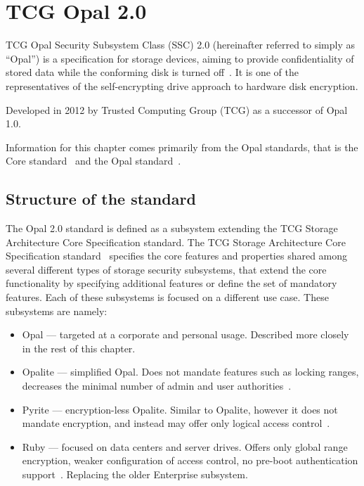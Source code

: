 \chapter{TCG Opal 2.0}

TCG Opal Security Subsystem Class (SSC) 2.0 (hereinafter referred to simply as ``Opal'') is a specification for storage devices, aiming to provide confidentiality of stored data while the conforming disk is turned off~\cite{tcg-opal2}. It is one of the representatives of the self-encrypting drive approach to hardware disk encryption.

Developed in 2012 by Trusted Computing Group (TCG) as a successor of Opal 1.0.

Information for this chapter comes primarily from the Opal standards, that is the Core standard~\cite{tcg-storage-core} and the Opal standard~\cite{tcg-opal2}.

\section{Structure of the standard}

The Opal 2.0 standard is defined as a subsystem extending the TCG Storage Architecture Core Specification standard. The TCG Storage Architecture Core Specification standard~\cite{tcg-storage-core} specifies the core features and properties shared among several different types of storage security subsystems, that extend the core functionality by specifying additional features or define the set of mandatory features. Each of these subsystems is focused on a different use case. These subsystems are namely: \begin{itemize}
    \item Opal --- targeted at a corporate and personal usage. Described more closely in the rest of this chapter.
    \item Opalite --- simplified Opal. Does not mandate features such as locking ranges, decreases the minimal number of admin and user authorities~\cite{tcg-opalite}. %
    \item Pyrite --- encryption-less Opalite. Similar to Opalite, however it does not mandate encryption, and instead may offer only logical access control~\cite{tcg-pyrite}.
    \item Ruby --- focused on data centers and server drives. Offers only global range encryption, weaker configuration of access control, no pre-boot authentication support~\cite{tcg-ruby}. Replacing the older Enterprise subsystem.
\end{itemize}

